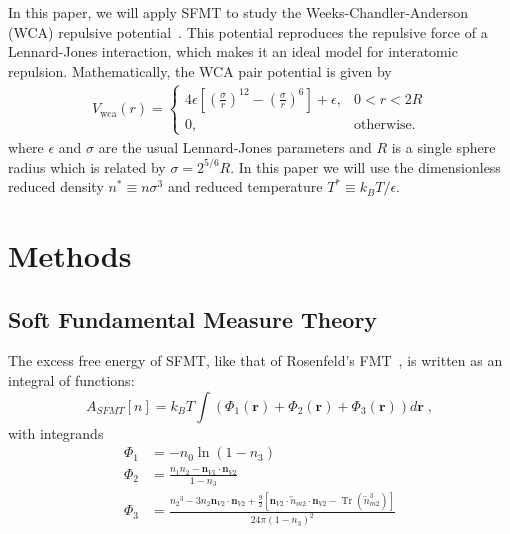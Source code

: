 \documentclass[letterpaper,twocolumn,amsmath,amssymb,prb]{revtex4-1}
\newcommand{\rr}{\textbf{r}}
\begin{document}

In this paper, we will apply SFMT to study the Weeks-Chandler-Anderson
(WCA) repulsive potential~\cite{weeks1971}.  This potential reproduces
the repulsive force of a Lennard-Jones interaction, which makes it an
ideal model for interatomic repulsion.  Mathematically, the WCA
pair potential is given by
\newcommand\erf{\mathrm{erf}}
\newcommand\Vwca{V_{\mathrm{wca}}}
\newcommand\Verf{V_{\erf}}
\begin{align}
  \Vwca(r) =
  \begin{cases}
    4\epsilon \left[ \left(\frac{\sigma}{r}\right)^{12} -
    \left(\frac{\sigma}{r}\right)^{6} \right] + \epsilon, & 0 < r < 2R \\
    0, & \textrm{otherwise}.
  \end{cases}
\label{eq:Vwca}
\end{align}
where $\epsilon$ and $\sigma$ are the usual Lennard-Jones parameters
and $R$ is a single sphere radius which is related by $\sigma =
2^{5/6} R$. In this paper we will use the dimensionless reduced
density $n^* \equiv n \sigma^3$ and reduced temperature $T^* \equiv
k_BT/\epsilon$.

\section{Methods}

\subsection{Soft Fundamental Measure Theory}

The excess free energy of SFMT, like that of Rosenfeld's
FMT~\cite{rosenfeld1989}, is written as an integral of functions: 
\begin{equation}
A_\textit{SFMT}[n] = k_B T \int \left(\Phi_1(\rr) + \Phi_2(\rr) +
\Phi_3(\rr)\right) d\rr \; , \label{eq:sfmt-excess-free}
\end{equation}
with integrands
\begin{align}
\Phi_1 &= -n_0 \ln\left( 1 - n_3\right)\\
\Phi_2 &= \frac{n_1 n_2 - \mathbf{n}_{V1}\cdot\mathbf{n}_{V2}}{1-n_3} \\
\Phi_3 &= \frac{{n_2}^3-3n_2\mathbf{n}_{V2}\cdot\mathbf{n}_{V2}+\frac{9}{2}[\mathbf{n}_{V2}\cdot{\overleftrightarrow{n}_{m2}}\cdot{\mathbf{n}_{V2}}-\operatorname{Tr}({\overleftrightarrow{n}^3_{m2}})]}{24\pi(1-n_3)^2}\\
\label{eq:sfmt-phi3}
\end{align}
\end{document}
